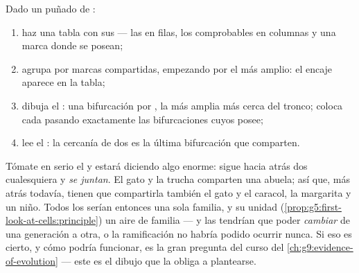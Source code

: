 \begin{method}\label{met:g6:classification-kinship:build}
Dado un puñado de :
\begin{enumerate}
  \item haz una tabla con sus  --- las  en filas, los
         comprobables en columnas y una marca donde se posean;
  \item agrupa por marcas compartidas, empezando por el  más
        amplio: el encaje aparece en la tabla;
  \item dibuja el : una bifurcación por , la más amplia
        más cerca del tronco; coloca cada  pasando exactamente
        las bifurcaciones cuyos  posee;
  \item lee el : la cercanía de dos  es la última
        bifurcación que comparten.
\end{enumerate}
\end{method}

\begin{remark}\label{rem:g6:classification-kinship:implies}
Tómate en serio el  y estará diciendo algo enorme: sigue hacia
atrás dos  cualesquiera y \emph{se juntan}. El gato y la trucha
comparten una  abuela; así que, más atrás todavía, tienen que
compartirla también el gato y el caracol, la margarita y un niño. Todos
los  serían entonces una sola familia, y su unidad
(\cref{prop:g5:first-look-at-cells:principle}) un aire de familia --- y
las  tendrían que poder \emph{cambiar} de una generación a
otra, o la ramificación no habría podido ocurrir nunca. Si eso es
cierto, y cómo podría funcionar, es la gran pregunta del curso del
\cref{ch:g9:evidence-of-evolution} --- este  es el dibujo que la
obliga a plantearse.
\end{remark}

